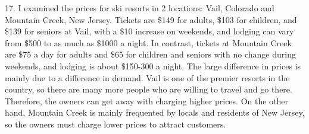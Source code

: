 \documentclass{article}
\begin{document}
17. I examined the prices for ski resorts in 2 locations: Vail, Colorado and Mountain Creek, New Jersey. Tickets are \$149 for adults, \$103 for children, and \$139 for seniors at Vail, with a \$10 increase on weekends, and lodging can vary from \$500 to as much as \$1000 a night. In contrast, tickets at Mountain Creek are \$75 a day for adults and \$65 for children and seniors with no change during weekends, and lodging is about \$150-300 a night. The large difference in prices is mainly due to a difference in demand. Vail is one of the premier resorts in the country, so there are many more people who are willing to travel and go there. Therefore, the owners can get away with charging higher prices. On the other hand, Mountain Creek is mainly frequented by locals and residents of New Jersey, so the owners must charge lower prices to attract customers.
\end{document}
